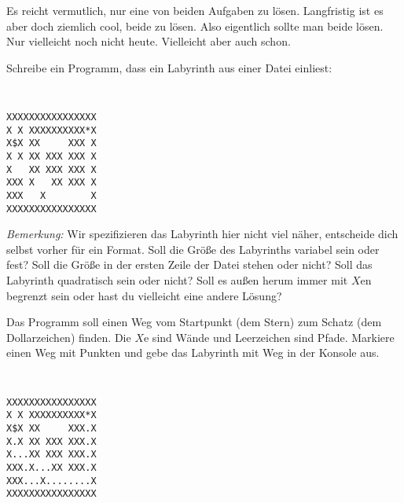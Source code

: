 \documentclass{uebungszettel}
\begin{document}
\newcommand{\ah}[2]{\ \\* \emph{(#1, #2)}\\}
\newcommand{\power}{\mathrm{power}}

Es reicht vermutlich, nur eine von beiden Aufgaben zu lösen. Langfristig ist es aber doch ziemlich cool, beide zu lösen. Also eigentlich sollte man beide lösen. Nur vielleicht noch nicht heute. Vielleicht aber auch schon.

\begin{aufg}
Schreibe ein Programm, dass ein Labyrinth aus einer Datei einliest:
\begin{center}
\begin{minipage}{1.8in}
{\tt
\lstset{language=Delphi}
\begin{lstlisting}
XXXXXXXXXXXXXXXX
X X XXXXXXXXXX*X
X$X XX     XXX X
X X XX XXX XXX X
X   XX XXX XXX X
XXX X   XX XXX X
XXX   X        X
XXXXXXXXXXXXXXXX
\end{lstlisting}
}
\end{minipage}
\end{center}
\emph{Bemerkung: } Wir spezifizieren das Labyrinth hier nicht viel näher, entscheide dich selbst vorher für ein Format. Soll die Größe des Labyrinths variabel sein oder fest? Soll die Größe in der ersten Zeile der Datei stehen oder nicht? Soll das Labyrinth quadratisch sein oder nicht? Soll es außen herum immer mit $X$en begrenzt sein oder hast du vielleicht eine andere Lösung?

\vspace{1.5ex} Das Programm soll einen Weg vom Startpunkt (dem Stern) zum Schatz (dem Dollarzeichen) finden. Die $X$e sind Wände und Leerzeichen sind Pfade. Markiere einen Weg mit Punkten und gebe das Labyrinth mit Weg in der Konsole aus.

\begin{center}
\begin{minipage}{1.8in}
{\tt
\lstset{language=Delphi}
\begin{lstlisting}
XXXXXXXXXXXXXXXX
X X XXXXXXXXXX*X
X$X XX     XXX.X
X.X XX XXX XXX.X
X...XX XXX XXX.X
XXX.X...XX XXX.X
XXX...X........X
XXXXXXXXXXXXXXXX
\end{lstlisting}}
\end{minipage}
\end{center}

\end{aufg}
\end{document}
